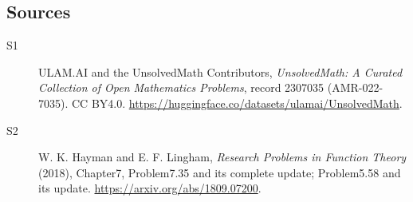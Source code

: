 \documentclass[11pt]{article}
\begin{document}
\subsection{Sources}
\begin{description}
\item[\hypertarget{source:2307035:1}{S1}] ULAM.AI and the UnsolvedMath Contributors, \emph{UnsolvedMath: A Curated Collection of Open Mathematics Problems}, record 2307035 (AMR-022-7035). CC BY4.0. \url{https://huggingface.co/datasets/ulamai/UnsolvedMath}.
\item[\hypertarget{source:2307035:2}{S2}] W. K. Hayman and E. F. Lingham, \emph{Research Problems in Function Theory} (2018), Chapter7, Problem7.35 and its complete update; Problem5.58 and its update. \url{https://arxiv.org/abs/1809.07200}.
\end{description}
\label{end:2307035}
\end{document}

